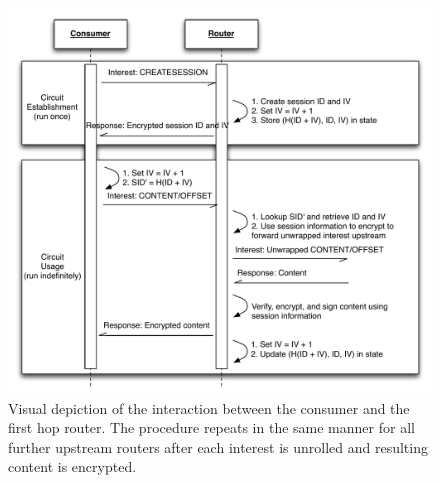 \begin{figure}[ht!]
\begin{center}
\includegraphics[scale=0.65]{./images/circuit_usage.pdf}
\end{center}
\caption{Visual depiction of the interaction between the consumer and the first hop router. The procedure repeats in the same manner for all further upstream routers after each interest is unrolled and resulting content is encrypted.}
\label{fig:circuit_usage}
\end{figure}
